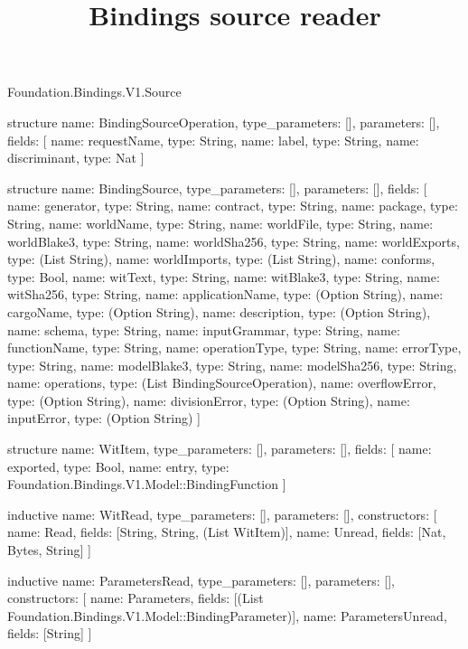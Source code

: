 \begin{lexlean}{Foundation.Bindings.V1.Source}
\title{Bindings source reader}
\begin{semanticmodule}
structure{
  name: BindingSourceOperation,
  type_parameters: [],
  parameters: [],
  fields: [
    {name: requestName, type: String},
    {name: label, type: String},
    {name: discriminant, type: Nat}
  ]
}

structure{
  name: BindingSource,
  type_parameters: [],
  parameters: [],
  fields: [
    {name: generator, type: String},
    {name: contract, type: String},
    {name: package, type: String},
    {name: worldName, type: String},
    {name: worldFile, type: String},
    {name: worldBlake3, type: String},
    {name: worldSha256, type: String},
    {name: worldExports, type: (List String)},
    {name: worldImports, type: (List String)},
    {name: conforms, type: Bool},
    {name: witText, type: String},
    {name: witBlake3, type: String},
    {name: witSha256, type: String},
    {name: applicationName, type: (Option String)},
    {name: cargoName, type: (Option String)},
    {name: description, type: (Option String)},
    {name: schema, type: String},
    {name: inputGrammar, type: String},
    {name: functionName, type: String},
    {name: operationType, type: String},
    {name: errorType, type: String},
    {name: modelBlake3, type: String},
    {name: modelSha256, type: String},
    {name: operations, type: (List BindingSourceOperation)},
    {name: overflowError, type: (Option String)},
    {name: divisionError, type: (Option String)},
    {name: inputError, type: (Option String)}
  ]
}

structure{
  name: WitItem,
  type_parameters: [],
  parameters: [],
  fields: [
    {name: exported, type: Bool},
    {name: entry, type: Foundation.Bindings.V1.Model::BindingFunction}
  ]
}

inductive{
  name: WitRead,
  type_parameters: [],
  parameters: [],
  constructors: [
    {name: Read, fields: [String, String, (List WitItem)]},
    {name: Unread, fields: [Nat, Bytes, String]}
  ]
}

inductive{
  name: ParametersRead,
  type_parameters: [],
  parameters: [],
  constructors: [
    {name: Parameters, fields: [(List Foundation.Bindings.V1.Model::BindingParameter)]},
    {name: ParametersUnread, fields: [String]}
  ]
}


\end{semanticmodule}
\end{lexlean}
